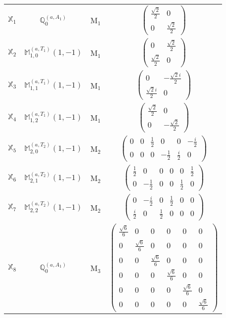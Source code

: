 \documentclass[fleqn,10pt,landscape]{article}
\begin{document}
\begin{itemize}
\begin{center}
\begin{longtable}{c|c|c|c}
$ \mathbb{X}_{1} $ & $\mathbb{Q}_{0}^{(a,A_{1})}$ & M$_{1}$ & $\begin{pmatrix} \frac{\sqrt{2}}{2} & 0 \\ 0 & \frac{\sqrt{2}}{2} \end{pmatrix}$ \\
$ \mathbb{X}_{2} $ & $\mathbb{M}_{1,0}^{(a,T_{1})}(1,-1)$ & M$_{1}$ & $\begin{pmatrix} 0 & \frac{\sqrt{2}}{2} \\ \frac{\sqrt{2}}{2} & 0 \end{pmatrix}$ \\
$ \mathbb{X}_{3} $ & $\mathbb{M}_{1,1}^{(a,T_{1})}(1,-1)$ & M$_{1}$ & $\begin{pmatrix} 0 & - \frac{\sqrt{2} i}{2} \\ \frac{\sqrt{2} i}{2} & 0 \end{pmatrix}$ \\
$ \mathbb{X}_{4} $ & $\mathbb{M}_{1,2}^{(a,T_{1})}(1,-1)$ & M$_{1}$ & $\begin{pmatrix} \frac{\sqrt{2}}{2} & 0 \\ 0 & - \frac{\sqrt{2}}{2} \end{pmatrix}$ \\ \hline
$ \mathbb{X}_{5} $ & $\mathbb{M}_{2,0}^{(a,T_{2})}(1,-1)$ & M$_{2}$ & $\begin{pmatrix} 0 & 0 & \frac{1}{2} & 0 & 0 & - \frac{i}{2} \\ 0 & 0 & 0 & - \frac{1}{2} & \frac{i}{2} & 0 \end{pmatrix}$ \\
$ \mathbb{X}_{6} $ & $\mathbb{M}_{2,1}^{(a,T_{2})}(1,-1)$ & M$_{2}$ & $\begin{pmatrix} \frac{1}{2} & 0 & 0 & 0 & 0 & \frac{1}{2} \\ 0 & - \frac{1}{2} & 0 & 0 & \frac{1}{2} & 0 \end{pmatrix}$ \\
$ \mathbb{X}_{7} $ & $\mathbb{M}_{2,2}^{(a,T_{2})}(1,-1)$ & M$_{2}$ & $\begin{pmatrix} 0 & - \frac{i}{2} & 0 & \frac{1}{2} & 0 & 0 \\ \frac{i}{2} & 0 & \frac{1}{2} & 0 & 0 & 0 \end{pmatrix}$ \\ \hline
$ \mathbb{X}_{8} $ & $\mathbb{Q}_{0}^{(a,A_{1})}$ & M$_{3}$ & $\begin{pmatrix} \frac{\sqrt{6}}{6} & 0 & 0 & 0 & 0 & 0 \\ 0 & \frac{\sqrt{6}}{6} & 0 & 0 & 0 & 0 \\ 0 & 0 & \frac{\sqrt{6}}{6} & 0 & 0 & 0 \\ 0 & 0 & 0 & \frac{\sqrt{6}}{6} & 0 & 0 \\ 0 & 0 & 0 & 0 & \frac{\sqrt{6}}{6} & 0 \\ 0 & 0 & 0 & 0 & 0 & \frac{\sqrt{6}}{6} \end{pmatrix}$ \\

\end{longtable}
\end{center}
\end{itemize}
\end{document}
